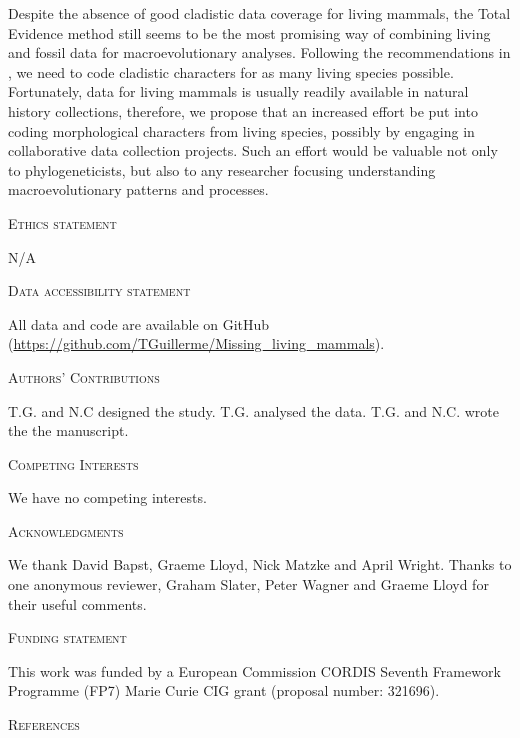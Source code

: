 \documentclass[12pt,letterpaper]{article}
\renewcommand{\section}[1]{%
\bigskip
\begin{center}
\begin{Large}
\normalfont\scshape #1
\medskip
\end{Large}
\end{center}}
\begin{document}
Despite the absence of good cladistic data coverage for living mammals, the Total Evidence method still seems to be the most promising way of combining living and fossil data for macroevolutionary analyses. 
Following the recommendations in \cite{GuillermeCooper}, we need to code cladistic characters for as many living species possible. 
Fortunately, data for living mammals is usually readily available in natural history collections, therefore, we propose that an increased effort be put into coding morphological characters from living species, possibly by engaging in collaborative data collection projects.
Such an effort would be valuable not only to phylogeneticists, but also to any researcher focusing understanding macroevolutionary patterns and processes.

\section{Ethics statement}
N/A
\section{Data accessibility statement}
All data and code are available on GitHub (\url{https://github.com/TGuillerme/Missing_living_mammals}).
\section{Authors' Contributions}
T.G. and N.C designed the study. T.G. analysed the data. T.G. and N.C. wrote the the manuscript.
\section{Competing Interests}
We have no competing interests.
\section{Acknowledgments}
We thank David Bapst, Graeme Lloyd, Nick Matzke and April Wright.
Thanks to one anonymous reviewer, Graham Slater, Peter Wagner and Graeme Lloyd for their useful comments.
\section{Funding statement}
This work was funded by a European Commission CORDIS Seventh Framework Programme (FP7) Marie Curie CIG grant (proposal number: 321696).

\section{References}




\end{document}
